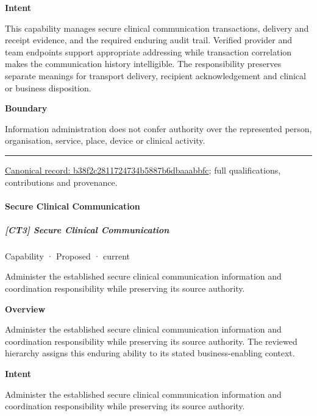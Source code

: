\textbf{Intent}



This capability manages secure clinical communication transactions, delivery and receipt evidence, and the required enduring audit trail. Verified provider and team endpoints support appropriate addressing while transaction correlation makes the communication history intelligible. The responsibility preserves separate meanings for transport delivery, recipient acknowledgement and clinical or business disposition.



\textbf{Boundary}



Information administration does not confer authority over the represented person, organisation, service, place, device or clinical activity.



\medskip\hrule\medskip

{\footnotesize \href{../../../../continuum/strategy/capability/b38f2c2811724734b5887b6dbaaabbfc.md}{Canonical record: b38f2c2811724734b5887b6dbaaabbfc}; full qualifications, contributions and provenance.}\par
\paragraph{Secure Clinical Communication}

\subparagraph{[CT3] Secure Clinical Communication}

\label{element:eddb86c7922145439b9dcf0259f4aed5}
{\small Capability · Proposed · current}\par

Administer the established secure clinical communication information and coordination responsibility while preserving its source authority.



\textbf{Overview}



Administer the established secure clinical communication information and coordination responsibility while preserving its source authority. The reviewed hierarchy assigns this enduring ability to its stated business-enabling context.



\textbf{Intent}



Administer the established secure clinical communication information and coordination responsibility while preserving its source authority.



